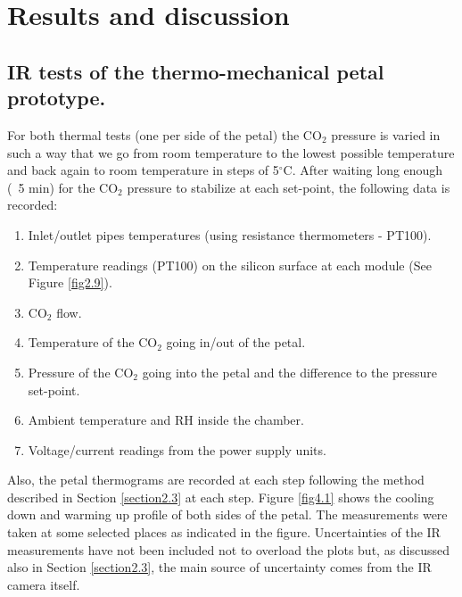 \pagestyle{standard}

\chapter{Results and discussion}\label{chapter4}

	\thispagestyle{chapter-first-page}

	\section{IR tests of the thermo-mechanical petal prototype.}\label{section4.1}
	
		For both thermal tests (one per side of the petal) the CO$_{2}$ pressure is varied in such a way that we go from room temperature to the lowest possible temperature and back again to room temperature in steps of 5\space$^{\circ}$C. After waiting long enough (~5 min) for the CO$_{2}$ pressure to stabilize at each set-point, the following data is recorded:
	
		\begin{enumerate}[label={\arabic*)}]
			\item Inlet/outlet pipes temperatures (using resistance thermometers - PT100).
			\item Temperature readings (PT100) on the silicon surface at each module (See Figure \ref{fig2.9}).
			\item CO$_{2}$ flow.
			\item Temperature of the CO$_{2}$ going in/out of the petal.
			\item Pressure of the CO$_{2}$ going into the petal and the difference to the pressure set-point.
			\item Ambient temperature and RH inside the chamber.
			\item Voltage/current readings from the power supply units.
		\end{enumerate}
	
		Also, the petal thermograms are recorded at each step following the method described in Section \ref{section2.3} at each step. Figure \ref{fig4.1} shows the cooling down and warming up profile of both sides of the petal. The measurements were taken at some selected places as indicated in the figure. Uncertainties of the IR measurements have not been included not to overload the plots but, as discussed also in Section \ref{section2.3}, the main source of uncertainty comes from the IR camera itself. 
	
